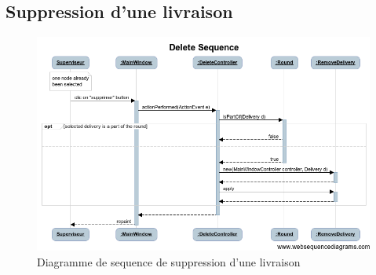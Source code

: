\begin{landscape}
    \subsection{Suppression d'une livraison}

    \begin{figure}[h]
        \centering
        \includegraphics[width=170mm]{../diagrams/sequences/delsequence.png}
        \caption{Diagramme de sequence de suppression d'une livraison}
        \label{diagram:seq_del_delivery}
    \end{figure}
\end{landscape}
\pagebreak
